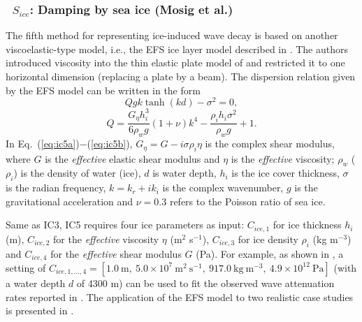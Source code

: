 \vsssub
\subsubsection{~$S_{ice}$: Damping by sea ice (Mosig et al.)} \label{sec:ICE5}
\vsssub


\noindent
The fifth method for representing ice-induced wave decay is based on another viscoelastic-type model, i.e., the EFS ice layer model described in \citet{art:MMS15}. The authors introduced viscosity into the thin elastic plate model of \citet{art:FS1994} and restricted it to one horizontal dimension (replacing a plate by a beam). The dispersion relation given by the EFS model can be written in the form
\begin{equation}
Q g k \tanh(k d)-\sigma^2 = 0,
\label{eq:ic5a}
\end{equation}
%
\begin{equation}
Q = \frac{G_{\eta} h_i^3}{6 \rho_w g} (1+\nu) k^4 - \frac{\rho_i h_i \sigma^2}{\rho_w g} + 1.
\label{eq:ic5b}
\end{equation}
%
In Eq.~(\ref{eq:ic5a})$-$(\ref{eq:ic5b}), $G_{\eta} = G - i \sigma \rho_i \eta$ is the complex shear modulus, where $G$ is the \emph{effective} elastic shear modulus and $\eta$ is the \emph{effective} viscosity; $\rho_w$ ($\rho_i$) is the density of water (ice), $d$ is water depth, $h_i$ is the ice cover thickness, $\sigma$ is the radian frequency, $k=k_r + i k_i$ is the complex wavenumber, $g$ is the gravitational acceleration and $\nu=0.3$ refers to the Poisson ratio of sea ice.

Same as {\code IC3}, {\code IC5} requires four ice parameters as input: $C_{ice, 1}$ for ice thickness $h_i$ (m), $C_{ice, 2}$ for the \emph{effective} viscosity $\eta$ (m$^2$ s$^{-1}$), $C_{ice, 3}$ for ice density $\rho_i$ (kg m$^{-3}$) and $C_{ice, 4}$ for the \emph{effective} shear modulus $G$ (Pa). For example, as shown in \citet[][see their Fig. 8]{art:MMS15}, a setting of $C_{ice, 1,...,4}=[1.0\ \mathrm{m},\ 5.0\times10^7\ \mathrm{m^2\ s^{-1}},\ 917.0\ \mathrm{kg\ m^{-3}},\ 4.9\times10^{12}\ \mathrm{Pa}]$ (with a water depth $d$ of 4300 m) can be used to fit the observed wave attenuation rates reported in \citet{art:MBK14}. The application of the EFS model to two realistic case studies is presented in \citet{Liu2018ic5}.

